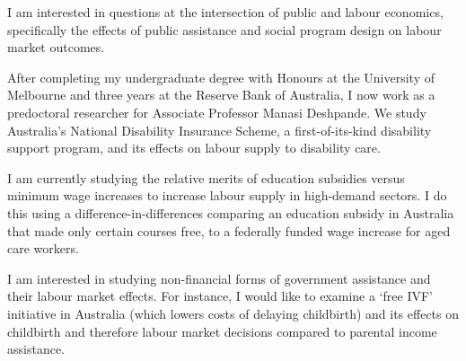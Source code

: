 I am interested in questions at the intersection of public and labour economics, specifically the effects of public assistance and social program design on labour market outcomes.

 After completing my undergraduate degree with Honours at the University of Melbourne and three years at the Reserve Bank of Australia, I now work as a predoctoral researcher for Associate Professor Manasi Deshpande. We study Australia's National Disability Insurance Scheme, a first-of-its-kind disability support program, and its effects on labour supply to disability care.

 I am currently studying the relative merits of education subsidies versus minimum wage increases to increase labour supply in high-demand sectors. I do this using a difference-in-differences comparing an education subsidy in Australia that made only certain courses free, to a federally funded wage increase for aged care workers. 

 I am interested in studying non-financial forms of government assistance and their labour market effects. For instance, I would like to examine a `free IVF' initiative in Australia (which lowers costs of delaying childbirth) and its effects on childbirth and therefore labour market decisions compared to parental income assistance.
